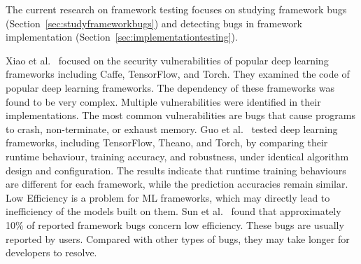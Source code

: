 \label{sec:frameworktesting}
The current research on framework testing focuses on studying framework bugs (Section~\ref{sec:studyframeworkbugs}) and detecting bugs in framework implementation (Section~\ref{sec:implementationtesting}).

\label{sec:studyframeworkbugs}
Xiao et al.~ focused on the security vulnerabilities of popular deep learning frameworks including Caffe, TensorFlow, and Torch.
They examined the code of popular deep learning frameworks.
The dependency of these frameworks was found to be very complex.
Multiple vulnerabilities were identified in their implementations. 
The most common vulnerabilities are bugs that cause programs to crash, non-terminate, or exhaust memory.
Guo et al.~ tested deep learning frameworks, including TensorFlow, Theano, and Torch, by comparing their runtime behaviour, training accuracy, and robustness, under identical algorithm design and configuration. 
The results indicate that runtime training behaviours are different for each framework, while the prediction accuracies remain similar.
Low Efficiency is a problem for ML frameworks, which may directly lead to inefficiency of the models built on them. 
Sun et al.~ found that approximately 10\% of reported framework bugs concern low efficiency.
These bugs are usually reported by users.
Compared with other types of bugs, they may take longer for developers to resolve.


